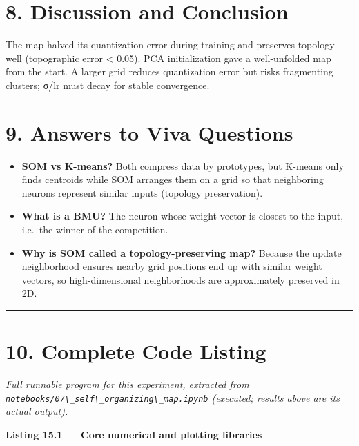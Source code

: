 \section{8. Discussion and Conclusion}\label{discussion-and-conclusion}

The map halved its quantization error during training and preserves
topology well (topographic error \textless{} 0.05). PCA initialization
gave a well-unfolded map from the start. A larger grid reduces
quantization error but risks fragmenting clusters; σ/lr must decay for
stable convergence.

\section{9. Answers to Viva Questions}\label{answers-to-viva-questions}

\begin{itemize}
\tightlist
\item
  \textbf{SOM vs K-means?} Both compress data by prototypes, but K-means
  only finds centroids while SOM arranges them on a grid so that
  neighboring neurons represent similar inputs (topology preservation).
\item
  \textbf{What is a BMU?} The neuron whose weight vector is closest to
  the input, i.e.~the winner of the competition.
\item
  \textbf{Why is SOM called a topology-preserving map?} Because the
  update neighborhood ensures nearby grid positions end up with similar
  weight vectors, so high-dimensional neighborhoods are approximately
  preserved in 2D.
\end{itemize}

\begin{center}\rule{0.5\linewidth}{0.5pt}\end{center}

\section{10. Complete Code Listing}\label{complete-code-listing}

\emph{Full runnable program for this experiment, extracted from
\passthrough{\lstinline!notebooks/07\_self\_organizing\_map.ipynb!}
(executed; results above are its actual output).}

\textbf{Listing 15.1 --- Core numerical and plotting libraries}

